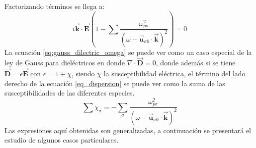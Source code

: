 \documentclass[../tesis_main_file.tex]{subfiles}
\begin{document}
Factorizando términos se llega a:
\begin{equation}
\label{eq:gauss_dilectric_omega}
i \overrightarrow{\textbf{k}} \cdot \overrightarrow{\textbf{E}} \left( 1 - \sum \frac{\omega_{p \sigma}^2 }{(\omega - \overrightarrow{\textbf{u}}_{\sigma 0} \cdot \overrightarrow{\textbf{k}})^2} \right) = 0
\end{equation}
La ecuación \ref{eq:gauss_dilectric_omega} se puede ver como un caso especial de la ley de Gauss para dieléctricos en donde $\nabla \cdot \overrightarrow{\textbf{D}}=0$, donde además si se tiene $\overrightarrow{\textbf{D}}= \epsilon \overrightarrow{\textbf{E}}$ con $\epsilon = 1+ \chi$, siendo $\chi$ la susceptibilidad eléctrica, el término del lado derecho de la ecuación \ref{eq_dispersion} se puede ver como la suma de las susceptibilidades de las diferentes especies.
\begin{equation}
\label{eq:suma_susceptibilidades}
\sum \chi _\sigma = - \sum_{\sigma} \frac{\omega_{p \sigma}^2}{(\omega - \overrightarrow{\textbf{u}}_{\sigma 0} \cdot \overrightarrow{\textbf{k}})^2}
\end{equation}
Las expresiones aquí obtenidas son generalizadas, a continuación se presentará el estudio de algunos casos particulares.
\end{document}
